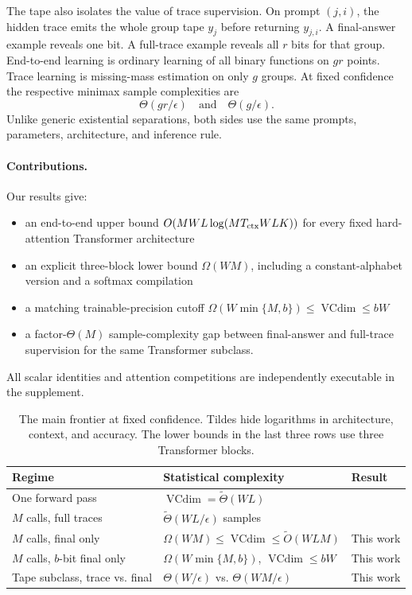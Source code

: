 \documentclass{article}
\newcommand{\1}{\mathbf 1}
\newcommand{\VC}{\operatorname{VCdim}}
\begin{document}
The tape also isolates the value of trace supervision. On prompt $(j,i)$, the hidden trace emits
the whole group tape $y_j$ before returning $y_{j,i}$. A final-answer example reveals one bit. A
full-trace example reveals all $r$ bits for that group. End-to-end learning is ordinary learning of
all binary functions on $gr$ points. Trace learning is missing-mass estimation on only $g$ groups.
At fixed confidence the respective minimax sample complexities are
\begin{equation}
 \Theta(gr/\epsilon)
 \quad\text{and}\quad
 \Theta(g/\epsilon).
 \label{eq:intro-gap}
\end{equation}
Unlike generic existential separations, both sides use the same prompts, parameters, architecture,
and inference rule.

\paragraph{Contributions.}
Our results give:
\begin{itemize}[leftmargin=*,itemsep=2pt,topsep=2pt]
 \item an end-to-end upper bound $O(MWL\log(MT_{\rm ctx}WLK))$ for every fixed
 hard-attention Transformer architecture
 \item an explicit three-block lower bound $\Omega(WM)$, including a constant-alphabet version
 and a softmax compilation
 \item a matching trainable-precision cutoff $\Omega(W\min\{M,b\})\leq
 \VC\leq bW$
 \item a factor-$\Theta(M)$ sample-complexity gap between final-answer and full-trace supervision
 for the same Transformer subclass.
\end{itemize}
All scalar identities and attention competitions are independently executable in the supplement.

\begin{table}[t]
\centering
\small
\setlength{\tabcolsep}{5pt}
\begin{tabular}{lll}
\toprule
Regime & Statistical complexity & Result\\
\midrule
One forward pass & $\VC=\widetilde\Theta(WL)$ & \citet{yang2026tight}\\
$M$ calls, full traces & $\widetilde\Theta(WL/\epsilon)$ samples & \citet{yang2026tight}\\
$M$ calls, final only & $\Omega(WM)\leq\VC\leq\widetilde O(WLM)$ & This work\\
$M$ calls, $b$-bit final only & $\Omega(W\min\{M,b\})$, $\VC\leq bW$ & This work\\
Tape subclass, trace vs. final & $\Theta(W/\epsilon)$ vs. $\Theta(WM/\epsilon)$ & This work\\
\bottomrule
\end{tabular}
\caption{The main frontier at fixed confidence. Tildes hide logarithms in architecture, context,
and accuracy. The lower bounds in the last three rows use three Transformer blocks.}
\label{tab:frontier}
\end{table}
\end{document}
